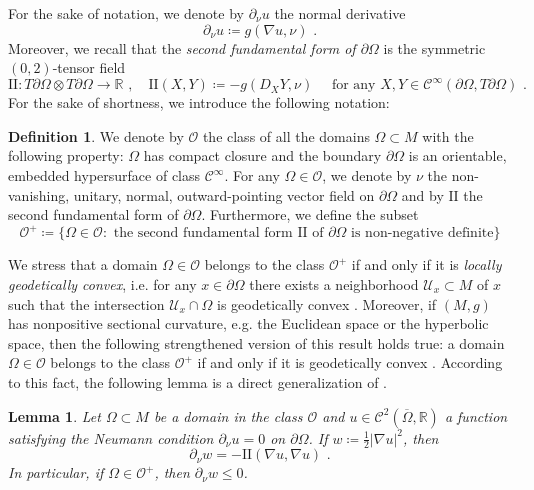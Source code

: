 \documentclass[10pt, a4paper, reqno, oneside]{amsart}
\theoremstyle{plain}
\theoremstyle{definition}
\newtheorem{definition}[theo]{Definition}
\theoremstyle{plain}
\newtheorem{lemma}[theo]{Lemma}
\theoremstyle{definition}
\theoremstyle{plain}
\renewcommand{\=}{:=}
\begin{document}
For the sake of notation, we denote by $\partial_\nu u$ the normal derivative
$$\partial_\nu u\coloneqq g(\nabla u,\nu) \,\, .$$
Moreover, we recall that the {\it second fundamental form of $\partial \Omega$} is the symmetric $(0,2)$-tensor field
\begin{equation}
\mathrm{II}: T\partial \Omega \otimes T\partial \Omega \to \mathbb{R} \,\, , \quad \mathrm{II}(X,Y) \coloneqq -g(D_XY,\nu) \quad \text{ for any } X, Y \in \mathcal{C}^{\infty}(\partial \Omega,T\partial \Omega) \,\, .
\end{equation}
For the sake of shortness, we introduce the following notation:

\begin{definition} \label{classO}
We denote by $\mathcal{O}$ the class of all the domains $\Omega \subset M$ with the following property: $\Omega$ has compact closure and the boundary $\partial \Omega$ is an orientable, embedded hypersurface of class $\mathcal{C}^{\infty}$. For any $\Omega \in \mathcal{O}$, we denote by $\nu$ the non-vanishing, unitary, normal, outward-pointing vector field on $\partial \Omega$ and by $\mathrm{II}$ the second fundamental form of $\partial \Omega$. Furthermore,  we define the subset
$$
\mathcal{O}^+ \coloneqq \big\{\Omega \in \mathcal{O} : \text{ the second fundamental form $\mathrm{II}$ of $\partial \Omega$ is non-negative definite}\big\}
$$
\end{definition}

We stress that a domain $\Omega \in \mathcal{O}$ belongs to the class $\mathcal{O}^+$ if and only if it is {\it locally geodetically convex}, i.e. for any $x \in \partial\Omega$ there exists a neighborhood $\mathcal{U}_x \subset M$ of $x$ such that the intersection $\mathcal{U}_x \cap \Omega$ is geodetically convex \cite{Bishop}. Moreover, if $(M,g)$ has nonpositive sectional curvature, e.g. the Euclidean space or the hyperbolic space, then the following strengthened version of this result holds true: a domain $\Omega \in \mathcal{O}$ belongs to the class $\mathcal{O}^+$ if and only if it is geodetically convex \cite[Theorem 1]{Alexander}. According to this fact, the following lemma is a direct generalization of \cite[Lemme I.1]{Lio80}.

\begin{lemma} \label{segno}
Let $\Omega \subset M$ be a domain in the class $\mathcal{O}$ and $u \in \mathcal{C}^2(\overline{\Omega},\mathbb{R})$ a function satisfying the Neumann condition $\partial_{\nu} u =0$ on $\partial \Omega$. If $w \coloneqq \tfrac12|\nabla u |^2$, then
$$
\partial_\nu w = -\mathrm{II}(\nabla u,\nabla u) \,\, .
$$
In particular, if $\Omega \in \mathcal{O}^+$, then $\partial_\nu w \leq 0$.
\end{lemma}
\end{document}

